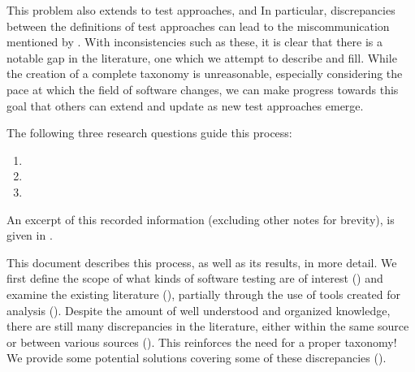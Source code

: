     This problem also extends to test approaches, and
\else
    In particular,
\fi
discrepancies between the definitions of test approaches can lead to the
miscommunication mentioned by \citet[p.~7]{KanerEtAl2011}. \expBasedCatMain{}
\tourDiscrep{}
\loadDiscrep{} \alphaDiscrep{} With inconsistencies such as these, it is clear
that there is a notable gap in the literature, one which we attempt to describe
and fill. While the creation of a complete taxonomy is unreasonable, especially
considering the pace at which the field of software changes, we can make
progress towards this goal that others can extend and update as new test
approaches emerge.

\ifnotpaper
    The following three research questions guide this process:
    \begin{enumerate}
        \item \rqatext{}
        \item \rqbtext{}
        \item \rqctext{}
    \end{enumerate}
    
    An excerpt of this recorded information (excluding other notes for brevity),
    is given in .
\fi

This document describes this process, as well as its results, in more detail.
We first define the scope of
what kinds of software testing are of interest () and examine the
existing literature ()\ifnotpaper, partially through the use
of tools created for analysis ()\fi. Despite the amount of well
understood and organized knowledge, there are still many discrepancies in the
literature, either within the same source or between various
sources (). This reinforces the need for a proper taxonomy! We
provide some potential solutions covering some of these discrepancies
().

\ifnotpaper
    \begin{bigLandscape}
        
    \end{bigLandscape}
\fi